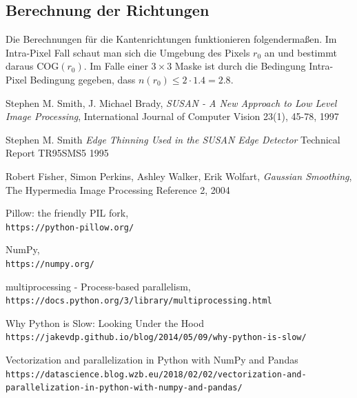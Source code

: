 \documentclass[a4paper, 11pt]{report}
\theoremstyle{definition}
\begin{document}
	 		\subsection{Berechnung der Richtungen}
	 			Die Berechnungen für die Kantenrichtungen funktionieren folgendermaßen. Im Intra-Pixel Fall schaut man sich die Umgebung des Pixels $r_0$ an und bestimmt daraus $\text{COG}(r_0)$. Im Falle einer $3\times 3$ Maske ist durch die Bedingung Intra-Pixel Bedingung gegeben, dass $n(r_0) \leq 2\cdot1.4=2.8$. 

\begin{thebibliography}{56}

	Stephen M. Smith, J. Michael Brady,
	\textit{SUSAN - A New Approach to Low Level Image Processing},
	International Journal of Computer Vision 23(1), 45-78,
	1997

	Stephen M. Smith
	\textit{Edge Thinning Used in the SUSAN Edge Detector}
	Technical Report TR95SMS5
	1995

	Robert Fisher, Simon Perkins, Ashley Walker, Erik Wolfart,
	\textit{Gaussian Smoothing},
	The Hypermedia Image Processing Reference 2,
	2004
	
	Pillow: the friendly PIL fork, \\
	\texttt{https://python-pillow.org/}

	NumPy, \\
	\texttt{https://numpy.org/}

	multiprocessing - Process-based parallelism, \\
	\texttt{https://docs.python.org/3/library/multiprocessing.html}

	Why Python is Slow: Looking Under the Hood
	\texttt{https://jakevdp.github.io/blog/2014/05/09/why-python-is-slow/}

	Vectorization and parallelization in Python with NumPy and Pandas
	\texttt{https://datascience.blog.wzb.eu/2018/02/02/vectorization-and-parallelization-in-python-with-numpy-and-pandas/}
\end{thebibliography}
			


%
\end{document}
